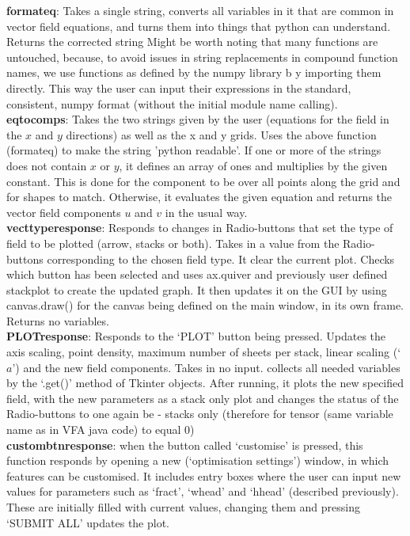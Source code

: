 \documentclass[11]{report}
\begin{document}
\textbf{format\textunderscore eq}: Takes a single string, converts all variables in it that are common in vector field equations, and turns them into things that python can understand. Returns the corrected string
Might be worth noting that many functions are untouched, because, to avoid issues in string replacements in compound function names, we use functions as defined by the numpy library b y importing them directly. This way the user can input their expressions in the standard, consistent, numpy format (without the initial module name calling). \\
\textbf{eq\textunderscore to\textunderscore comps}: Takes the two strings given by the user (equations for the field in the $x$ and $y$ directions) as well as the x and y grids. Uses the above function (format\textunderscore eq) to make the string 'python readable'. If one or more of the strings does not contain $x$ or $y$, it defines an array of ones and multiplies by the given constant. This is done for the component to be over all points along the grid and for shapes to match. Otherwise, it evaluates the given equation and returns the vector field components $u$ and $v$ in the usual way.\\
\textbf{vect\textunderscore type\textunderscore response}: Responds to changes in Radio-buttons that set the type of field to be plotted (arrow, stacks or both). Takes in a value from the Radio-buttons corresponding to the chosen field type. It clear the current plot. Checks which button has been selected and uses ax.quiver and previously user defined stack\textunderscore plot to create the updated graph. It then updates it on the GUI by using canvas.draw() for the canvas being defined on the main window, in its own frame. Returns no variables.\\
\textbf{PLOT\textunderscore response}: Responds to the `PLOT' button being pressed. Updates the axis scaling, point density, maximum number of sheets per stack, linear scaling (`$a$') and the new field components. Takes in no input. collects all needed variables by the `.get()' method of Tkinter objects. After running, it plots the new specified field, with the new parameters as a stack only plot and changes the status of the Radio-buttons to one again be - stacks only (therefore for tensor (same variable name as in VFA java code) to equal 0)\\
\textbf{custom\textunderscore btn\textunderscore response}: when the button called `customise' is pressed, this function responds by opening a new (`optimisation settings') window, in which features can be customised. It includes entry boxes where the user can input new values for parameters such as `fract', `w\textunderscore head' and `h\textunderscore head' (described previously). These are initially filled with current values, changing them and pressing `SUBMIT ALL' updates the plot.\\
\end{document}
